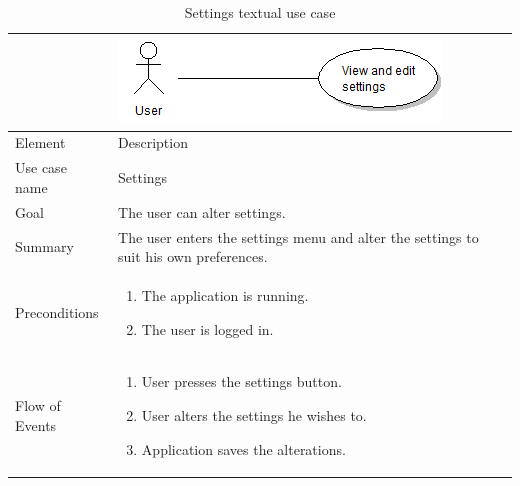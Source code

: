 \begin{table}
\begin{tabular}{p{3cm}p{12cm}}
& \includegraphics{settings}\\ \hline
Element & Description \\ \hline
Use case name & Settings \\
Goal & The user can alter settings. \\
Summary & The user enters the settings menu and alter the settings to suit his own preferences. \\
Preconditions &
\begin{enumerate}
\item{}The application is running.
\item{}The user is logged in.
\end{enumerate} \\ \hline
Flow of Events &
\begin{enumerate}
\item{}User presses the settings button.
\item{}User alters the settings he wishes to.
\item{}Application saves the alterations.
\end{enumerate}
\end{tabular}
\caption{Settings textual use case} \label{tab:settings}
\end{table}
